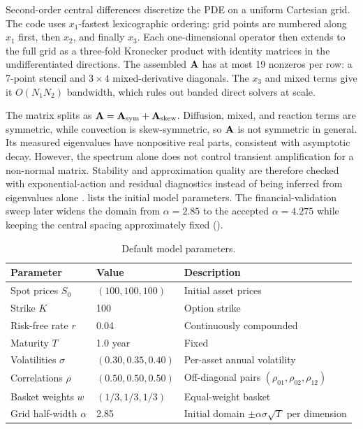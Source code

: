 Second-order central differences discretize the PDE on a uniform Cartesian grid. The code uses $x_1$-fastest lexicographic ordering: grid points are numbered along $x_1$ first, then $x_2$, and finally $x_3$. Each one-dimensional operator then extends to the full grid as a three-fold Kronecker product with identity matrices in the undifferentiated directions. The assembled $\mathbf{A}$ has at most 19 nonzeros per row: a 7-point stencil and $3 \times 4$ mixed-derivative diagonals. The $x_3$ and mixed terms give it $O(N_1 N_2)$ bandwidth, which rules out banded direct solvers at scale.

The matrix splits as $\mathbf{A}=\mathbf{A}_{\text{sym}}+\mathbf{A}_{\text{skew}}$. Diffusion, mixed, and reaction terms are symmetric, while convection is skew-symmetric, so $\mathbf{A}$ is not symmetric in general. Its measured eigenvalues have nonpositive real parts, consistent with asymptotic decay. However, the spectrum alone does not control transient amplification for a non-normal matrix. Stability and approximation quality are therefore checked with exponential-action and residual diagnostics instead of being inferred from eigenvalues alone \cite{hundsdorfer-verwer-2003}.  lists the initial model parameters. The financial-validation sweep later widens the domain from $\alpha=2.85$ to the accepted $\alpha=4.275$ while keeping the central spacing approximately fixed ().

\begin{table}[htbp!]
\centering
\caption{Default model parameters.}
\label{tab:params}
\begin{tabular}{@{}lll@{}}
\toprule
\textbf{Parameter} & \textbf{Value} & \textbf{Description} \\
\midrule
Spot prices $S_0$ & $(100, 100, 100)$ & Initial asset prices \\
Strike $K$ & 100 & Option strike \\
Risk-free rate $r$ & 0.04 & Continuously compounded \\
Maturity $T$ & 1.0 year & Fixed \\
Volatilities $\sigma$ & $(0.30, 0.35, 0.40)$ & Per-asset annual volatility \\
Correlations $\rho$ & $(0.50, 0.50, 0.50)$ & Off-diagonal pairs $(\rho_{01}, \rho_{02}, \rho_{12})$ \\
Basket weights $w$ & $(1/3, 1/3, 1/3)$ & Equal-weight basket \\
Grid half-width $\alpha$ & 2.85 & Initial domain $\pm \alpha \sigma \sqrt{T}$ per dimension \\
\bottomrule
\end{tabular}
\end{table}


